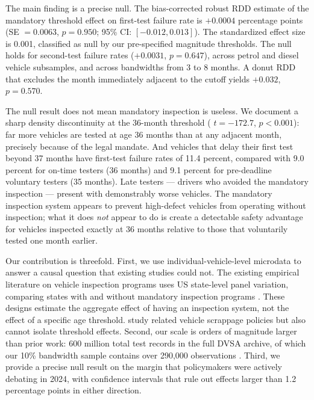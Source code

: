 \documentclass[12pt]{article}
\begin{document}
The main finding is a precise null. The bias-corrected robust RDD estimate of the mandatory threshold effect on first-test failure rate is $+0.0004$ percentage points (SE $= 0.0063$, $p = 0.950$; 95\% CI: $[-0.012, 0.013]$). The standardized effect size is 0.001, classified as null by our pre-specified magnitude thresholds. The null holds for second-test failure rates ($+0.0031$, $p = 0.647$), across petrol and diesel vehicle subsamples, and across bandwidths from 3 to 8 months. A donut RDD that excludes the month immediately adjacent to the cutoff yields $+0.032$, $p = 0.570$.

The null result does not mean mandatory inspection is useless. We document a sharp density discontinuity at the 36-month threshold (\citealt{McCrary2008} $t = -172.7$, $p < 0.001$): far more vehicles are tested at age 36 months than at any adjacent month, precisely because of the legal mandate. And vehicles that delay their first test beyond 37 months have first-test failure rates of 11.4 percent, compared with 9.0 percent for on-time testers (36 months) and 9.1 percent for pre-deadline voluntary testers (35 months). Late testers --- drivers who avoided the mandatory inspection --- present with demonstrably worse vehicles. The mandatory inspection system appears to prevent high-defect vehicles from operating without inspection; what it does \emph{not} appear to do is create a detectable safety advantage for vehicles inspected exactly at 36 months relative to those that voluntarily tested one month earlier.

Our contribution is threefold. First, we use individual-vehicle-level microdata to answer a causal question that existing studies could not. The existing empirical literature on vehicle inspection programs uses US state-level panel variation, comparing states with and without mandatory inspection programs \citep{Lund1985,Wenzel2001,Calthrop2000,Hvoslef1994}. These designs estimate the aggregate effect of having an inspection system, not the effect of a specific age threshold. \citet{JacobsenVanBenthem2015} study related vehicle scrappage policies but also cannot isolate threshold effects. Second, our scale is orders of magnitude larger than prior work: 600 million total test records in the full DVSA archive, of which our 10\% bandwidth sample contains over 290,000 observations \citep{Cattaneo2020}. Third, we provide a precise null result on the margin that policymakers were actively debating in 2024, with confidence intervals that rule out effects larger than 1.2 percentage points in either direction.
\end{document}
